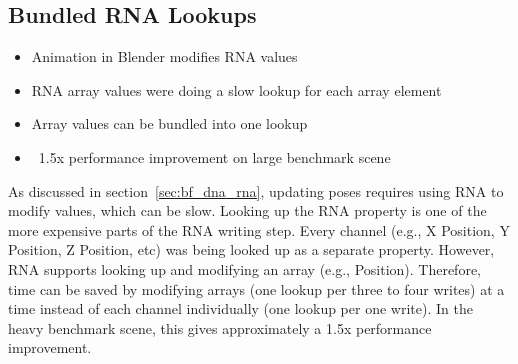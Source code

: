 
\subsection{Bundled RNA Lookups}
\ifsummaries
\begin{itemize}
 \item Animation in Blender modifies RNA values
 \item RNA array values were doing a slow lookup for each array element
 \item Array values can be bundled into one lookup
 \item ~1.5x performance improvement on large benchmark scene
\end{itemize}
\fi

As discussed in section~\ref{sec:bf_dna_rna}, updating poses requires using RNA to modify values, which can be slow.
Looking up the RNA property is one of the more expensive parts of the RNA writing step.
Every channel (e.g., X Position, Y Position, Z Position, etc) was being looked up as a separate property.
However, RNA supports looking up and modifying an array (e.g., Position).
Therefore, time can be saved by modifying arrays (one lookup per three to four writes) at a time instead of each channel individually (one lookup per one write).
In the heavy benchmark scene, this gives approximately a 1.5x performance improvement.

